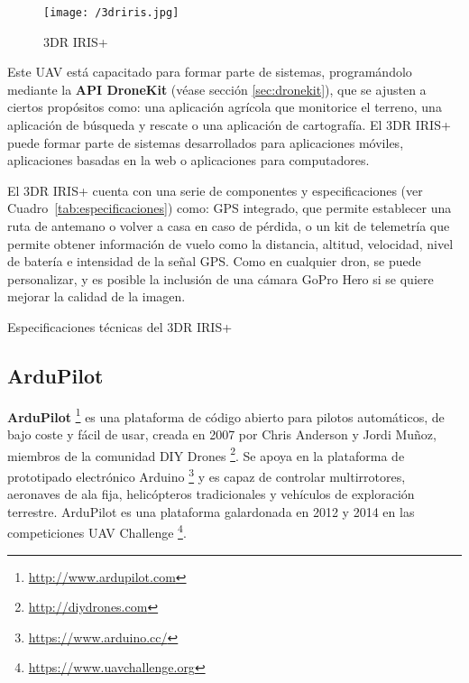 \begin{figure}[!h]
\begin{center}
\texttt{[image: /3driris.jpg]}
\caption[3DR IRIS+]{3DR IRIS+}
\label{fig:3dririsplus}
\end{center}
\end{figure}

Este \acs{UAV} está capacitado para formar parte de sistemas, programándolo mediante la \textbf{\acs{API} DroneKit} (véase sección \ref{sec:dronekit}), que se ajusten a ciertos propósitos como: una aplicación agrícola que monitorice el terreno, una aplicación de búsqueda y rescate o una aplicación de cartografía. El 3DR IRIS+ puede formar parte de sistemas desarrollados para aplicaciones móviles, aplicaciones basadas en la web o aplicaciones para computadores.

El 3DR IRIS+ cuenta con una serie de componentes y especificaciones (ver Cuadro~\ref{tab:especificaciones}) como: GPS integrado, que permite establecer una ruta de antemano o volver a casa en caso de pérdida, o un kit de telemetría que permite obtener información de vuelo como la distancia, altitud, velocidad, nivel de batería e intensidad de la señal \acs{GPS}. Como en cualquier dron, se puede personalizar, y es posible la inclusión de una cámara GoPro Hero si se quiere mejorar la calidad de la imagen.

\begin{table}[!h]
 \centering
 {\small
 
 }
 \caption[Especificaciones técnicas del 3DR IRIS+]
 {Especificaciones técnicas del 3DR IRIS+ \cite{especifaciones3dr}}
 \label{tab:especificaciones}
\end{table}

\subsection{ArduPilot}
\label{sec:ardupilot}

\textbf{ArduPilot} \footnote{\url{http://www.ardupilot.com}} es una plataforma de código abierto para pilotos automáticos, de bajo coste y fácil de usar, creada en 2007 por Chris Anderson y Jordi Muñoz, miembros de la comunidad DIY Drones \footnote{\url{http://diydrones.com}}. Se apoya en la plataforma de prototipado electrónico Arduino \footnote{\url{https://www.arduino.cc/}} y es capaz de controlar multirrotores, aeronaves de ala fija, helicópteros tradicionales y vehículos de exploración terrestre. ArduPilot es una plataforma galardonada en 2012 y 2014 en las competiciones UAV Challenge \footnote{\url{https://www.uavchallenge.org}}.

